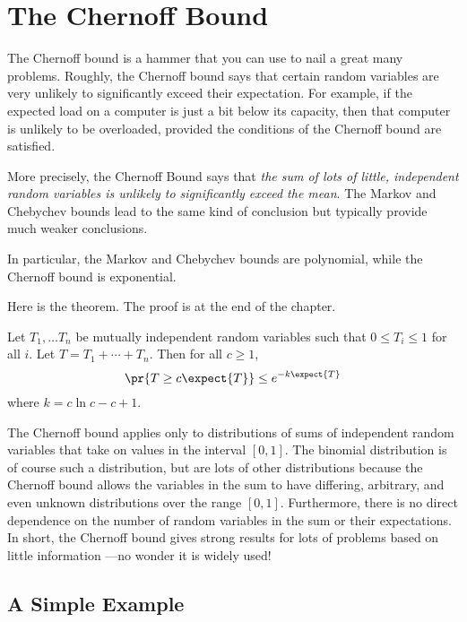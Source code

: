 \section{The Chernoff Bound}

The Chernoff bound is a hammer that you can use to nail a great many
problems.  Roughly, the Chernoff bound says that certain random
variables are very unlikely to significantly exceed their expectation.
For example, if the expected load on a computer is just a bit below
its capacity, then that computer is unlikely to be overloaded,
provided the conditions of the Chernoff bound are satisfied.

More precisely, the Chernoff Bound says that \emph{the sum of lots of
  little, independent random variables is unlikely to significantly
  exceed the mean}.  The Markov and Chebychev bounds lead to the same
kind of conclusion but typically provide much weaker conclusions.

\begin{editingnotes}
In particular, the Markov and Chebychev bounds are polynomial, while
the Chernoff bound is exponential.
\end{editingnotes}

Here is the theorem.  The proof is at the end of the chapter.

\begin{theorem}
\label{chernoff}
Let $T_1, \dots T_n$ be mutually independent random variables such
that $0 \leq T_i \leq 1$ for all $i$.  Let $T = T_1 + \cdots + T_n$.
Then for all $c \geq 1$,
\begin{equation}\label{chernoff-leq}
\pr{T \geq c \expect{T}} \leq e^{-k \expect{T}} 
\end{equation}
where $k = c \ln c - c + 1$.
\end{theorem}

The Chernoff bound applies only to distributions of sums of
independent random variables that take on values in the interval $[0,
  1]$.  The binomial distribution is of course such a distribution,
but are lots of other distributions because the Chernoff bound allows
the variables in the sum to have differing, arbitrary, and even unknown
distributions over the range $[0, 1]$.  Furthermore, there is no
direct dependence on the number of random variables in the sum or
their expectations.  In short, the Chernoff bound gives strong results
for lots of problems based on little information ---no wonder it is
widely used!

\subsection{A Simple Example}

